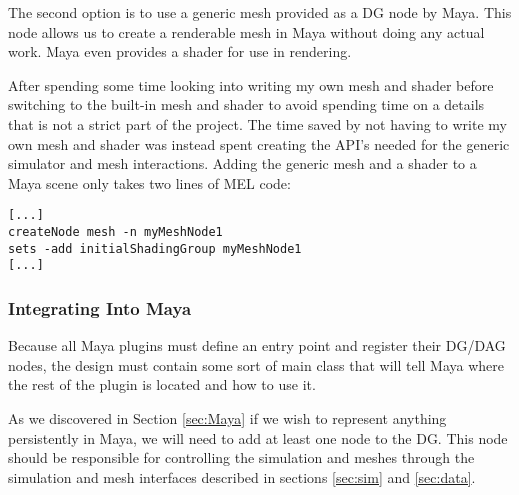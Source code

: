 The second option is to use a generic mesh provided as a DG node by Maya. This
node allows us to create a renderable mesh in Maya without doing any actual
work. Maya even provides a shader for use in rendering.

After spending some time looking into writing my own mesh and shader before switching to
the built-in mesh and shader to avoid spending time on a details
that is not a strict part of the project. The time saved by not having to write
my own mesh and shader was instead spent creating the API's needed for the
generic simulator and mesh interactions. Adding the generic mesh and a shader
to a Maya scene only takes two lines of MEL code:
\begin{verbatim}
[...]
createNode mesh -n myMeshNode1
sets -add initialShadingGroup myMeshNode1
[...]
\end{verbatim}

\subsubsection{Integrating Into Maya}

Because all Maya plugins must define an entry point and register their DG/DAG
nodes, the design must contain some sort of main class that will tell Maya
where the rest of the plugin is located and how to use it.

As we discovered in Section \ref{sec:Maya} if we wish to represent anything
persistently in Maya, we will need to add at least one node to the DG. This node
should be responsible for controlling the simulation and meshes through the
simulation and mesh interfaces described in sections \ref{sec:sim} and
\ref{sec:data}.


